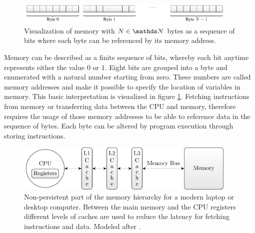 \documentclass{stdlocal}
\begin{document}
    \begin{figure}
      \center
      \includegraphics[width=0.95\textwidth]{figures/memory.pdf}
      \caption[Memory Structure]{%
        Visualization of memory with $N\in\setNatural$ bytes as a sequence of bits where each byte can be referenced by its memory address.%
      }
      \label{fig:memory}
    \end{figure}

    Memory can be described as a finite sequence of bits, whereby each bit anytime represents either the value $0$ or $1$.
    Eight bits are grouped into a byte and enumerated with a natural number starting from zero.
    These numbers are called memory addresses and make it possible to specify the location of variables in memory.
    This basic interpretation is visualized in figure \ref{fig:memory}.
    Fetching instructions from memory or transferring data between the CPU and memory, therefore requires the usage of those memory addresses to be able to reference data in the sequence of bytes.
    Each byte can be altered by program execution through storing instructions.
    \autocite{patterson2014}

    \begin{figure}
      \center
      \includegraphics[width=0.95\textwidth]{figures/memory_hierarchy.pdf}
      \caption[Memory Hierarchy]{%
        Non-persistent part of the memory hierarchy for a modern laptop or desktop computer.
        Between the main memory and the CPU registers different levels of caches are used to reduce the latency for fetching instructions and data.
        Modeled after \textcite[\pno~79]{hennessy2019}.
      }
      \label{fig:memory-hierarchy}
    \end{figure}
\end{document}
